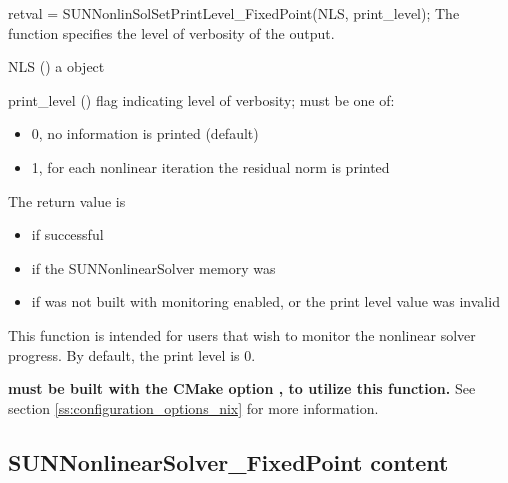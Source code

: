 {
  retval = SUNNonlinSolSetPrintLevel\_FixedPoint(NLS, print\_level);
}
{
  The function  specifies the
  level of verbosity of the output.
}
{
  \begin{args}
  \item[NLS] ()
    a {\sunnonlinsol} object
  \item[print\_level] () flag indicating level of verbosity;
    must be one of:
    \begin{itemize}
      \item 0, no information is printed (default)
      \item 1, for each nonlinear iteration the residual norm is printed
    \end{itemize}
  \end{args}
}
{
  The return value is
  \begin{itemize}
    \item {} if successful
    \item {} if the SUNNonlinearSolver memory was 
    \item {} if {\sundials} was not built with monitoring enabled,
      or the print level value was invalid
  \end{itemize}
}
{
  This function is intended for users that wish to monitor the nonlinear
  solver progress. By default, the print level is 0.

  \textbf{{\sundials} must be built with the CMake option
  , to utilize this function.}
  See section \ref{ss:configuration_options_nix} for more information.
}


\subsection{SUNNonlinearSolver\_FixedPoint content}
\label{ss:sunnonlinsolfixedpoint_content}

